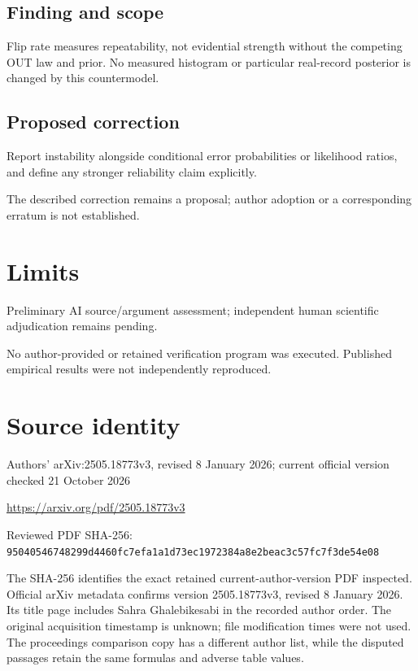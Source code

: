 \documentclass[11pt]{article}
\begin{document}
\subsection*{Finding and scope}

Flip rate measures repeatability, not evidential strength without the competing OUT law and prior. No measured histogram or particular real-record posterior is changed by this countermodel.

\subsection*{Proposed correction}

Report instability alongside conditional error probabilities or likelihood ratios, and define any stronger reliability claim explicitly.

The described correction remains a proposal; author adoption or a corresponding erratum is not established.

\section*{Limits}

Preliminary AI source/argument assessment; independent human scientific adjudication remains pending.\par

No author-provided or retained verification program was executed. Published empirical results were not independently reproduced.\par

\section*{Source identity}

Authors’ arXiv:2505.18773v3, revised 8 January 2026; current official version checked 21 October 2026

\url{https://arxiv.org/pdf/2505.18773v3}

Reviewed PDF SHA-256: \nolinkurl{95040546748299d4460fc7efa1a1d73ec1972384a8e2beac3c57fc7f3de54e08}

The SHA-256 identifies the exact retained current-author-version PDF inspected. Official arXiv metadata confirms version 2505.18773v3, revised 8 January 2026. Its title page includes Sahra Ghalebikesabi in the recorded author order. The original acquisition timestamp is unknown; file modification times were not used. The proceedings comparison copy has a different author list, while the disputed passages retain the same formulas and adverse table values.
\end{document}

